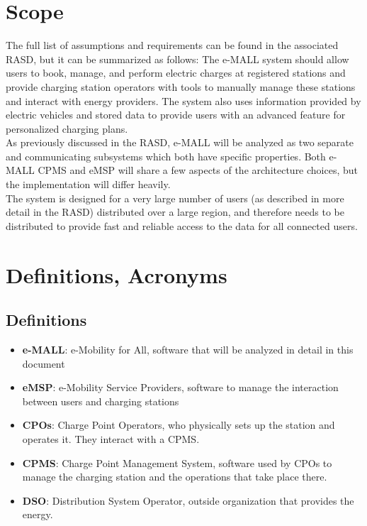 \documentclass[12pt]{report}
\begin{document}
\section{Scope}
The full list of assumptions and requirements can be found in the associated RASD, but it can be summarized as follows: The e-MALL system should allow users to book, manage, and perform electric charges at registered stations and provide charging station operators with tools to manually manage these stations and interact with energy providers. The system also uses information provided by electric vehicles and stored data to provide users with an advanced feature for personalized charging plans.\\
As previously discussed in the RASD, e-MALL will be analyzed as two separate and communicating subsystems which both have specific properties. Both e-MALL CPMS and eMSP will share a few aspects of the architecture choices, but the implementation will differ heavily.\\
The system is designed for a very large number of users (as described in more detail in the RASD) distributed over a large region, and therefore needs to be distributed to provide fast and reliable access to the data for all connected users.

\section{Definitions, Acronyms}
\subsection{Definitions}
\begin{itemize}
    \item\textbf{e-MALL}: e-Mobility for All, software that will be analyzed in detail in this document
    \item\textbf{eMSP}: e-Mobility Service Providers, software to manage the interaction between users and charging stations
    \item\textbf{CPOs}: Charge Point Operators, who physically sets up the station and operates it. They interact with a CPMS.
    \item\textbf{CPMS}: Charge Point Management System, software used by CPOs to manage the charging station and the operations that take place there.
    \item\textbf{DSO}: Distribution System Operator, outside organization that provides the energy.\\
\end{itemize}
\end{document}
